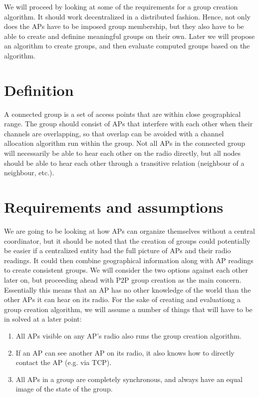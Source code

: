 \documentclass[a4paper,UKenglish]{report}
\begin{document}
We will proceed by looking at some of the requirements for a group creation algorithm. It should work decentralized in a distributed fashion.
Hence, not only does the APs have to be imposed group membership, but they also have to be able to create and definine meaningful groups on their own.
Later we will propose an algorithm to create groups, and then evaluate computed groups based on the algorithm.


\section{Definition}
A connected group is a set of access points that are within close geographical range. The group should consist of APs that
interfere with each other when their channels are overlapping, so that overlap can be avoided with a channel allocation algorithm run within the group.
Not all APs in the connected group will necessarily be able to hear each other on the radio directly,
but all nodes should be able to hear each other through a transitive relation (neighbour of a neighbour, etc.).

\section{Requirements and assumptions}
We are going to be looking at how APs can organize themselves without a central coordinator,
but it should be noted that the creation of groups could potentially be easier if a centralized entity had the full picture of APs and their radio readings.
It could then combine geographical information along with AP readings to create consistent groups.
We will consider the two options against each other later on, but proceeding ahead with P2P group creation as the main concern. 
Essentially this means that an AP has no other knowledge of the world than the other APs it can hear on its radio.
For the sake of creating and evaluationg a group creation algorithm, we will assume a number of things that will have to be in solved at a later point:
\begin{enumerate}
	\item All APs visible on any AP's radio also runs the group creation algorithm.
	\item If an AP can see another AP on its radio, it also knows how to directly contact the AP (e.g. via TCP).
	\item All APs in a group are completely synchronous, and always have an equal image of the state of the group. 
\end{enumerate}
\end{document}
